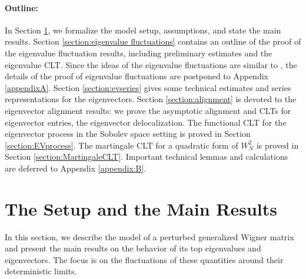 \documentclass[11pt, reqno]{amsart}
\numberwithin{equation}{section}
\begin{document}
\paragraph{\bf Outline:} In Section \ref{section:setup}, we formalize the model setup, assumptions, and state the main results. Section \ref{section:eigenvalue fluctuations} contains an outline of the proof of the eigenvalue fluctuation results, including preliminary estimates and the eigenvalue CLT. Since the ideas of the eigenvalue fluctuations are similar to \cite{chakrabarty2020eigenvalues}, the details of the proof of eigenvalue fluctuations are postponed to Appendix \ref{appendixA}. Section \ref{section:evseries} gives some technical estimates and series representations for the eigenvectors. Section \ref{section:alignment} is devoted to the eigenvector alignment results: we prove the asymptotic alignment and CLTs for eigenvector entries, the eigenvector delocalization. The functional CLT for the eigenvector process in the Sobolev space setting is proved in Section \ref{section:EVprocess}. The martingale CLT for a quadratic form of $W_N^2$ is proved in Section \ref{section:MartingaleCLT}.   Important technical lemmas and calculations are deferred to Appendix \ref{appendix:B}. 

\section{The Setup and the Main Results}\label{section:setup}
In this section, we describe the model of a perturbed generalized Wigner matrix  and present the main results on the behavior of its top eigenvalues and eigenvectors. The focus is on the fluctuations of these
quantities around their deterministic limits.
\end{document}
